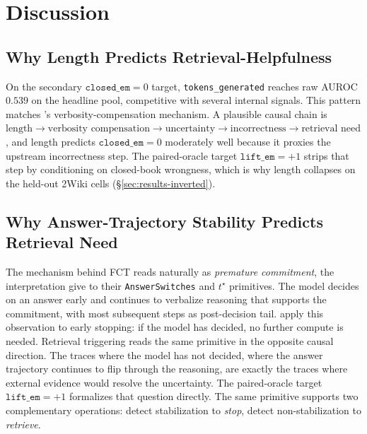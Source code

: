 \documentclass[11pt]{article}
\begin{document}
\section{Discussion}
\label{sec:discussion}

\subsection{Why Length Predicts Retrieval-Helpfulness}
\label{sec:discussion-causal}

On the secondary $\texttt{closed\_em}{=}0$ target, \texttt{tokens\_generated} reaches raw AUROC $0.539$ on the headline pool, competitive with several internal signals. This pattern matches \citet{zhang_verbosity_2024}'s verbosity-compensation mechanism. A plausible causal chain is $\text{length} \rightarrow \text{verbosity compensation} \rightarrow \text{uncertainty} \rightarrow \text{incorrectness} \rightarrow \text{retrieval need}$, and length predicts $\texttt{closed\_em}{=}0$ moderately well because it proxies the upstream incorrectness step. The paired-oracle target $\texttt{lift\_em}{=}+1$ strips that step by conditioning on closed-book wrongness, which is why length collapses on the held-out 2Wiki cells (\S\ref{sec:results-inverted}).

\subsection{Why Answer-Trajectory Stability Predicts Retrieval Need}
\label{sec:discussion-fct}

The mechanism behind FCT reads naturally as \emph{premature commitment}, the interpretation \citet{datta_large_2026} give to their \texttt{AnswerSwitches} and $t^\star$ primitives. The model decides on an answer early and continues to verbalize reasoning that supports the commitment, with most subsequent steps as post-decision tail. \citeauthor{datta_large_2026} apply this observation to early stopping: if the model has decided, no further compute is needed. Retrieval triggering reads the same primitive in the opposite causal direction. The traces where the model has not decided, where the answer trajectory continues to flip through the reasoning, are exactly the traces where external evidence would resolve the uncertainty. The paired-oracle target $\texttt{lift\_em}{=}+1$ formalizes that question directly. The same primitive supports two complementary operations: detect stabilization to \emph{stop}, detect non-stabilization to \emph{retrieve}.
\end{document}

